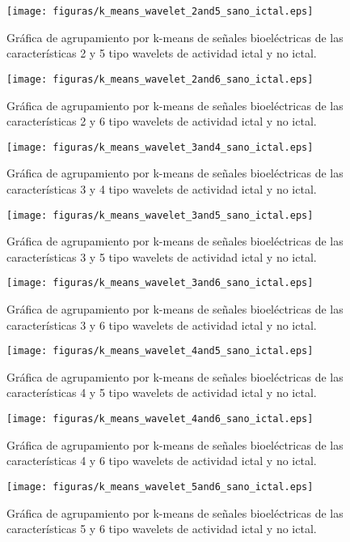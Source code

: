 \begin{figure}[H]
    \centering
    \texttt{[image: figuras/k\_means\_wavelet\_2and5\_sano\_ictal.eps]}
    \caption{Gráfica de agrupamiento por k-means de señales bioeléctricas de las características 2 y 5 tipo wavelets de actividad ictal y no ictal.}
    \label{fig: k_means_wave_2_5}
\end{figure}
\begin{figure}[H]
    \centering
    \texttt{[image: figuras/k\_means\_wavelet\_2and6\_sano\_ictal.eps]}
    \caption{Gráfica de agrupamiento por k-means de señales bioeléctricas de las características 2 y 6 tipo wavelets de actividad ictal y no ictal.}
    \label{fig: k_means_wave_2_6}
\end{figure}
\begin{figure}[H]
    \centering
    \texttt{[image: figuras/k\_means\_wavelet\_3and4\_sano\_ictal.eps]}
    \caption{Gráfica de agrupamiento por k-means de señales bioeléctricas de las características 3 y 4 tipo wavelets de actividad ictal y no ictal.}
    \label{fig: k_means_wave_3_4}
\end{figure}
\begin{figure}[H]
    \centering
    \texttt{[image: figuras/k\_means\_wavelet\_3and5\_sano\_ictal.eps]}
    \caption{Gráfica de agrupamiento por k-means de señales bioeléctricas de las características 3 y 5 tipo wavelets de actividad ictal y no ictal.}
    \label{fig: k_means_wave_3_5}
\end{figure}
\begin{figure}[H]
    \centering
    \texttt{[image: figuras/k\_means\_wavelet\_3and6\_sano\_ictal.eps]}
    \caption{Gráfica de agrupamiento por k-means de señales bioeléctricas de las características 3 y 6 tipo wavelets de actividad ictal y no ictal.}
    \label{fig: k_means_wave_3_6}
\end{figure}
\begin{figure}[H]
    \centering
    \texttt{[image: figuras/k\_means\_wavelet\_4and5\_sano\_ictal.eps]}
    \caption{Gráfica de agrupamiento por k-means de señales bioeléctricas de las características 4 y 5 tipo wavelets de actividad ictal y no ictal.}
    \label{fig: k_means_wave_4_5}
\end{figure}
\begin{figure}[H]
    \centering
    \texttt{[image: figuras/k\_means\_wavelet\_4and6\_sano\_ictal.eps]}
    \caption{Gráfica de agrupamiento por k-means de señales bioeléctricas de las características 4 y 6 tipo wavelets de actividad ictal y no ictal.}
    \label{fig: k_means_wave_4_6}
\end{figure}
\begin{figure}[H]
    \centering
    \texttt{[image: figuras/k\_means\_wavelet\_5and6\_sano\_ictal.eps]}
    \caption{Gráfica de agrupamiento por k-means de señales bioeléctricas de las características 5 y 6 tipo wavelets de actividad ictal y no ictal.}
    \label{fig: k_means_wave_5_6}
\end{figure}


